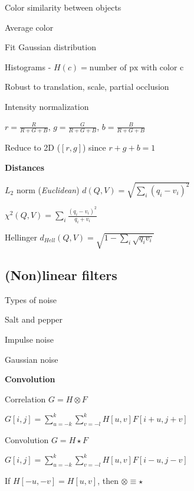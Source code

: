 \documentclass{article}
\begin{document}
\begin{multicols*}{2}
{Color similarity between objects
\begin{compactitem}
	\item Average color
	\item Fit Gaussian distribution
	\item Histograms - $H(c) = \text{number of px with color c}$
	
	Robust to translation, scale, partial occlusion
	
	\item Intensity normalization
	
	$r=\frac{R}{R+G+B}$,
	$g=\frac{G}{R+G+B}$,
	$b=\frac{B}{R+G+B}$
	
	Reduce to 2D ($[r,g]$) since
	$r+g+b=1$	
\end{compactitem}

\textbf{Distances}
\begin{compactitem}
	\item $L_2$ norm (\textit{Euclidean})
	$d(Q,V) = \sqrt{\sum_i(q_i-v_i)^2}$
	
	\item $\chi^2(Q, V) = \sum_i{\frac{(q_i - v_i)^2}{q_i+v_i}}$
	
	\item Hellinger $d_{Hell}(Q, V) = \sqrt{1 - \sum_i{\sqrt{q_i v_i}}}$
\end{compactitem}

\subsection{(Non)linear filters}

Types of noise
\begin{compactitem}
	\item Salt and pepper
	\item Impulse noise
	\item Gaussian noise
\end{compactitem}

\textbf{Convolution}
\begin{compactitem}
	\item Correlation $G = H \otimes F$
	
	$G[i,j] = \sum_{u=-k}^{k}\sum_{v=-l}^{k}H[u,v]F[i+u,j+v]$
	
	\item Convolution $G = H \star F$

	$G[i,j] = \sum_{u=-k}^{k}\sum_{v=-l}^{k}H[u,v]F[i-u,j-v]$
	
	If $H[-u,-v] = H[u,v]$, then $\otimes \equiv \star$
	

\end{compactitem}}
\end{multicols*}
\end{document}
